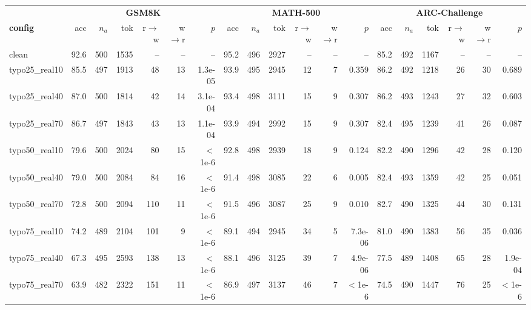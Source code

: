 \begin{tabular}{l rrrrrr rrrrrr rrrrrr}
\toprule
& \multicolumn{6}{c}{\textbf{GSM8K}} & \multicolumn{6}{c}{\textbf{MATH-500}} & \multicolumn{6}{c}{\textbf{ARC-Challenge}} \\
\cmidrule(lr){2-7}\cmidrule(lr){8-13}\cmidrule(lr){14-19}
\textbf{config} & acc & $n_a$ & tok & r$\to$w & w$\to$r & $p$ & acc & $n_a$ & tok & r$\to$w & w$\to$r & $p$ & acc & $n_a$ & tok & r$\to$w & w$\to$r & $p$ \\
\midrule
clean & 92.6 & 500 & 1535 & -- & -- & -- & 95.2 & 496 & 2927 & -- & -- & -- & 85.2 & 492 & 1167 & -- & -- & -- \\
typo25\_real10 & 85.5 & 497 & 1913 & 48 & 13 & 1.3e-05 & 93.9 & 495 & 2945 & 12 & 7 & 0.359 & 86.2 & 492 & 1218 & 26 & 30 & 0.689 \\
typo25\_real40 & 87.0 & 500 & 1814 & 42 & 14 & 3.1e-04 & 93.4 & 498 & 3111 & 15 & 9 & 0.307 & 86.2 & 493 & 1243 & 27 & 32 & 0.603 \\
typo25\_real70 & 86.7 & 497 & 1843 & 43 & 13 & 1.1e-04 & 93.9 & 494 & 2992 & 15 & 9 & 0.307 & 82.4 & 495 & 1239 & 41 & 26 & 0.087 \\
typo50\_real10 & 79.6 & 500 & 2024 & 80 & 15 & $<$1e-6 & 92.8 & 498 & 2939 & 18 & 9 & 0.124 & 82.2 & 490 & 1296 & 42 & 28 & 0.120 \\
typo50\_real40 & 79.0 & 500 & 2084 & 84 & 16 & $<$1e-6 & 91.4 & 498 & 3085 & 22 & 6 & 0.005 & 82.4 & 493 & 1359 & 42 & 25 & 0.051 \\
typo50\_real70 & 72.8 & 500 & 2094 & 110 & 11 & $<$1e-6 & 91.5 & 496 & 3087 & 25 & 9 & 0.010 & 82.7 & 490 & 1325 & 44 & 30 & 0.131 \\
typo75\_real10 & 74.2 & 489 & 2104 & 101 & 9 & $<$1e-6 & 89.1 & 494 & 2945 & 34 & 5 & 7.3e-06 & 81.0 & 490 & 1383 & 56 & 35 & 0.036 \\
typo75\_real40 & 67.3 & 495 & 2593 & 138 & 13 & $<$1e-6 & 88.1 & 496 & 3125 & 39 & 7 & 4.9e-06 & 77.5 & 489 & 1408 & 65 & 28 & 1.9e-04 \\
typo75\_real70 & 63.9 & 482 & 2322 & 151 & 11 & $<$1e-6 & 86.9 & 497 & 3137 & 46 & 7 & $<$1e-6 & 74.5 & 490 & 1447 & 76 & 25 & $<$1e-6 \\
\bottomrule
\end{tabular}

